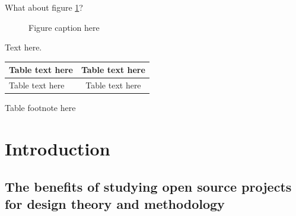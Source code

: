 \documentclass{ICED-Paper}%
\begin{document}

What about figure \ref{fig1}?

\begin{figure}
\caption{Figure caption here\label{fig1}}
\end{figure}

Text here.

\begin{table}
{\tabcolsep=2pc\begin{tabular}{|l|c|}%
\hline
Table text here & Table text here\\%
\hline
Table text here & Table text here\\%
\hline
\end{tabular}}{Table footnote here}
\end{table}

\section{Introduction}

\subsection{The benefits of studying open source projects for design theory and methodology}
\end{document}

